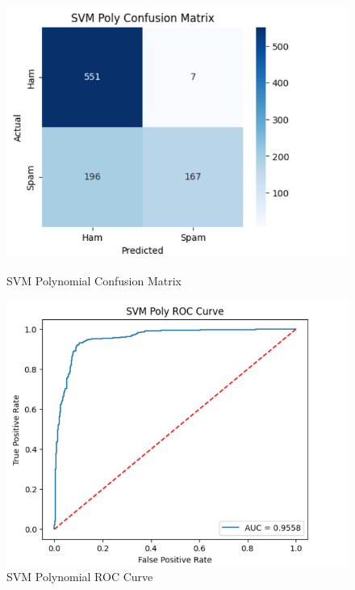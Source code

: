 \documentclass[12pt]{article}
\begin{document}
\begin{figure}[H]
\centering
\begin{minipage}{0.45\textwidth}
\centering
\includegraphics[width=\linewidth]{22.png}
\caption{SVM Polynomial Confusion Matrix}
\end{minipage}
\hfill
\begin{minipage}{0.45\textwidth}
\centering
\includegraphics[width=\linewidth]{23.png}
\caption{SVM Polynomial ROC Curve}
\end{minipage}
\end{figure}
\end{document}
